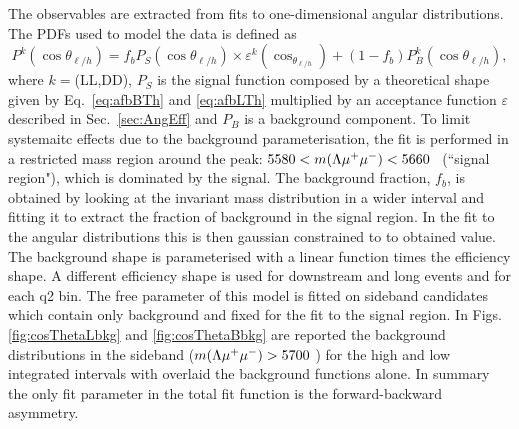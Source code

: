 The observables are extracted from fits to one-dimensional angular distributions.
%
%
The PDFs used to model the data is defined as
%
\begin{equation}
P^k(\cos\theta_{\ell/h}) = f_b P_S(\cos\theta_{\ell/h}) \times \varepsilon^k(\cos_{\theta_{\ell/h}}) + 
		(1-f_b)P_B^k(\cos\theta_{\ell/h}),
\end{equation}
%
where $k=$(LL,DD), $P_S$ is the signal function composed by a theoretical shape given by Eq.~\ref{eq:afbBTh} and
\ref{eq:afbLTh} multiplied by an acceptance function $\varepsilon$ described in Sec.~\ref{sec:AngEff}
and $P_B$ is a background component. To limit systemaitc effects due to the background parameterisation, 
the fit is performed in a restricted mass region around the peak:
$5580 < m(\Lambda\mu^+\mu^-) < 5660 $ \mevcc ~(``signal region"), which is dominated by the signal.
The background fraction, $f_b$, is obtained by looking at the invariant mass distribution 
in a wider interval and fitting it to extract the fraction of background in the signal region.
In the fit to the angular distributions this is then gaussian constrained to to obtained value.
The background shape is parameterised with a linear function times the efficiency shape.
A different efficiency shape is used for downstream and long events and for each q2 bin.
The free parameter of this model is fitted on sideband candidates which contain only background
and fixed for the fit to the signal region. In Figs. \ref{fig:cosThetaLbkg} and \ref{fig:cosThetaBbkg} 
are reported the background distributions in the sideband ($m(\Lambda\mu^+\mu^-) > 5700$ \mevcc)
for the high and low \qsq integrated intervals with overlaid the background functions alone.
In summary the only fit parameter in the total fit function is the forward-backward asymmetry.

